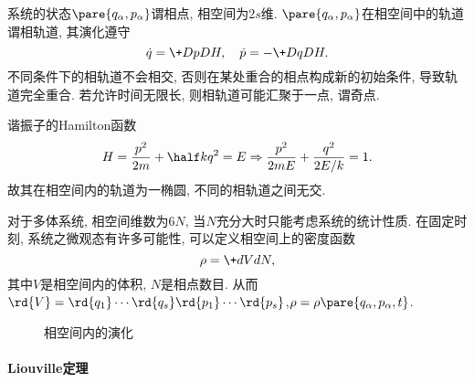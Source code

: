\documentclass[../LectureNotes.tex]{subfiles}
\begin{document}
系统的状态$\pare{q_\alpha,p_\alpha}$谓相点, 相空间为$2s$维. $\pare{q_\alpha,p_\alpha}$在相空间中的轨道谓相轨道, 其演化遵守
\[ \dot{q} = \+DpDH,\quad \dot{p} = -\+DqDH. \]
不同条件下的相轨道不会相交, 否则在某处重合的相点构成新的初始条件, 导致轨道完全重合. 若允许时间无限长, 则相轨道可能汇聚于一点, 谓奇点.
\begin{ex}
    谐振子的Hamilton函数
    \[ H = \frac{p^2}{2m} + \half kq^2 = E \Rightarrow \frac{p^2}{2mE} + \frac{q^2}{2E/k} = 1. \]
    故其在相空间内的轨道为一椭圆, 不同的相轨道之间无交.
\end{ex}
对于多体系统, 相空间维数为$6N$, 当$N$充分大时只能考虑系统的统计性质. 在固定时刻, 系统之微观态有许多可能性, 可以定义相空间上的密度函数
\[ \rho = \+dVdN, \]
其中$V$是相空间内的体积, $N$是相点数目. 从而$\rd{V} = \rd{q_1}\cdots \rd{q_s}\rd{p_1}\cdots\rd{p_s}$,\quad $\rho = \rho\pare{q_\alpha,p_\alpha,t}$.


\begin{figure}
    \centering
    \caption{相空间内的演化}
    \label{fig:相空间内的演化}
\end{figure}

\paragraph{Liouville定理} %
\label{par:liouville定理}
\end{document}
